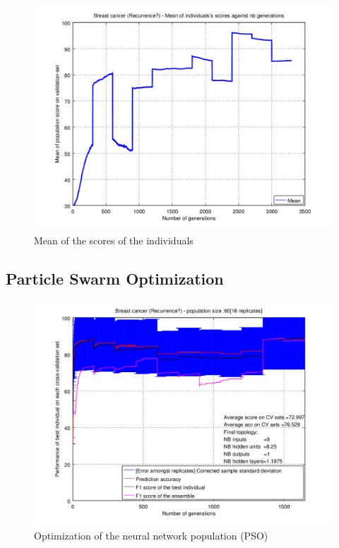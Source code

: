 \documentclass[a4paper,12pt, oneside]{memoir}
\begin{document}
\clearpage

\begin{figure}[h]
  \centering
  \includegraphics[scale=0.7]{recurrence-meanVSepochs-DE}
  \vspace{-12pt}
  \caption{Mean of the scores of the individuals}
  \label{recurrence-mean-DE}
\end{figure}

\clearpage

\subsection{Particle Swarm Optimization}

\begin{figure}[h]
  \centering
  \includegraphics[scale=0.7]{recurrence-performancesVSepochs-PSO}
  \vspace{-12pt}
  \caption{Optimization of the neural network population (PSO)}
  \label{recurrence-perfs-PSO}
\end{figure}
\end{document}
